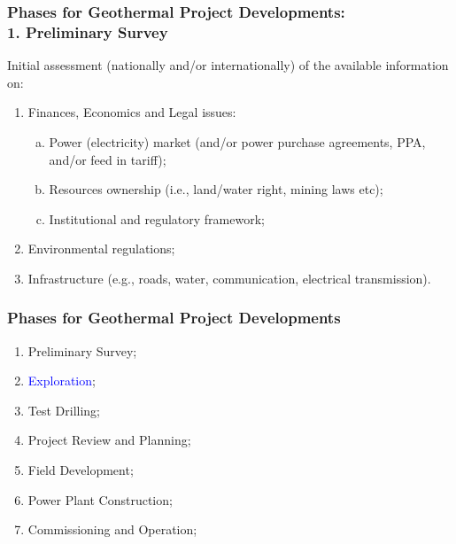 \documentclass[10pt,compress]{beamer}
\newcommand{\blue}{\textcolor{blue}}
\begin{document}
\begin{frame}
 \frametitle{Phases for Geothermal Project Developments: \\1. Preliminary Survey} 

    Initial assessment (nationally and/or internationally) of the available information on:
    \begin{enumerate}[{1.}1]
       \item <1-> Finances, Economics and Legal issues:
          \begin{enumerate}[(a)]
             \item<2-> Power (electricity) market (and/or power purchase agreements, PPA, and/or feed in tariff);
             \item<2-> Resources ownership (i.e., land/water right, mining laws etc);
             \item<2-> Institutional and regulatory framework;
          \end{enumerate}
       \item <3-> Environmental regulations; 
       \item <4-> Infrastructure (e.g., roads, water, communication, electrical transmission).
    \end{enumerate}
\end{frame}

\begin{frame}
 \frametitle{Phases for Geothermal Project Developments} 
    \begin{enumerate}[1.]
       \item <1-> Preliminary Survey;
       \item <2-> \blue{Exploration}; 
       \item <1-> Test Drilling;
       \item <1-> Project Review and Planning;
       \item <1-> Field Development; 
       \item <1-> Power Plant Construction;
       \item <1-> Commissioning and Operation;
    \end{enumerate}
\end{frame}
\end{document}
